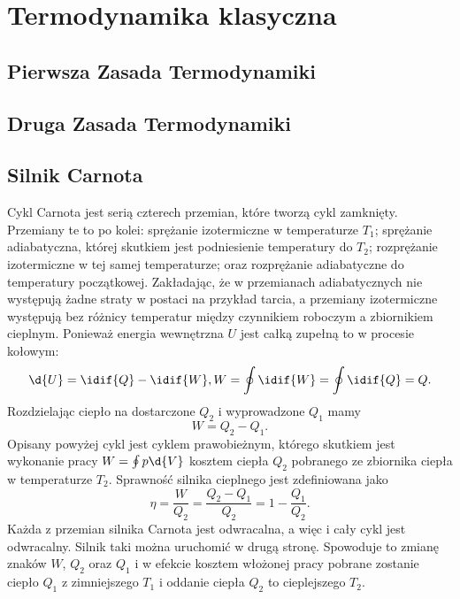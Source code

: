 \chapter{Termodynamika klasyczna}

\section{Pierwsza Zasada Termodynamiki}

\section{Druga Zasada Termodynamiki}

\section{Silnik Carnota}
Cykl Carnota jest serią czterech przemian, które tworzą cykl zamknięty. Przemiany te to po kolei: sprężanie izotermiczne w temperaturze $T_1$; sprężanie adiabatyczna, której skutkiem jest podniesienie temperatury do $T_2$; rozprężanie izotermiczne w tej samej temperaturze; oraz rozprężanie adiabatyczne do temperatury początkowej. Zakładając, że w przemianach adiabatycznych nie występują żadne straty w postaci na przykład tarcia, a przemiany izotermiczne występują bez różnicy temperatur między czynnikiem roboczym a zbiornikiem cieplnym. Ponieważ energia wewnętrzna $U$ jest całką zupełną to w procesie kołowym:
\begin{gather}
\d{U} = \idif{Q} - \idif{W},
W = \oint \idif{W} = \oint \idif{Q} = Q.
\end{gather}
Rozdzielając ciepło na dostarczone $Q_2$ i wyprowadzone $Q_1$ mamy
\begin{equation}
W = Q_2 - Q_1.
\end{equation}
Opisany powyżej cykl jest cyklem prawobieżnym, którego skutkiem jest wykonanie pracy $W = \oint p \d{V}$ kosztem ciepła $Q_2$ pobranego ze zbiornika ciepła w temperaturze $T_2$. 
Sprawność silnika cieplnego jest zdefiniowana jako
\begin{equation}\label{eq:def_sprawnosc_silnika}
\eta = \frac{W}{Q_2} = \frac{Q_2 - Q_1}{Q_2} = 1 - \frac{Q_1}{Q_2}.
\end{equation}
Każda z przemian silnika Carnota jest odwracalna, a więc i cały cykl jest odwracalny. Silnik taki można uruchomić w drugą stronę. Spowoduje to zmianę znaków $W$, $Q_2$ oraz $Q_1$ i w efekcie kosztem włożonej pracy pobrane zostanie ciepło $Q_1$ z zimniejszego $T_1$ i oddanie ciepła $Q_2$ to cieplejszego $T_2$. 

